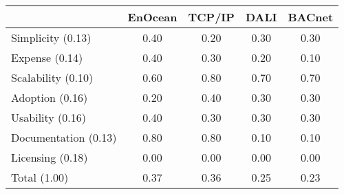     \begin{tabular}{|l|c|c|c|c|}
        \hline
        ~                    & EnOcean & TCP/IP & DALI & BACnet \\ \hline
        Simplicity    (0.13) & 0.40    & 0.20   & 0.30 & 0.30   \\ \hline
        Expense       (0.14) & 0.40    & 0.30   & 0.20 & 0.10   \\ \hline
        Scalability   (0.10) & 0.60    & 0.80   & 0.70 & 0.70   \\ \hline
        Adoption      (0.16) & 0.20    & 0.40   & 0.30 & 0.30   \\ \hline
        Usability     (0.16) & 0.40    & 0.30   & 0.30 & 0.30   \\ \hline
        Documentation (0.13) & 0.80    & 0.80   & 0.10 & 0.10   \\ \hline
        Licensing     (0.18) & 0.00    & 0.00   & 0.00 & 0.00   \\ \hline
        Total         (1.00) & 0.37    & 0.36   & 0.25 & 0.23   \\ \hline
    \end{tabular}

